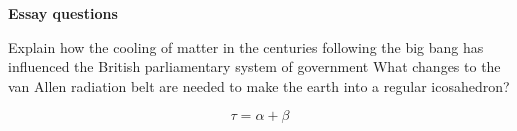 \documentclass{exam}
\begin{document}
\begin{EnvFullwidth}
\Large \textbf{Essay questions}
\end{EnvFullwidth}

\begin{questions}
\question
Explain how the cooling of matter in the centuries following the big
bang has influenced the British parliamentary system of government
\fillwithlines{2in}
\question
What changes to the van Allen radiation belt are needed to make
the earth into a regular icosahedron?
\fillwithlines{1in}

\end{questions}
$$\tau = \alpha + \beta$$
\end{document}
